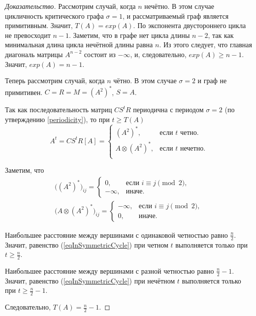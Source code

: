 \documentclass[12pt]{article}
\theoremstyle{definition}
\begin{document}
\begin{proof}[Доказательство]
Рассмотрим случай, когда $n$ нечётно. В этом случае цикличность критического графа $\sigma = 1$, и рассматриваемый граф является примитивным. Значит, $T(A) = exp(A)$. По \cite[теорема 3.1]{kLocalExponent} экспонента двустороннего цикла не превосходит $n - 1$. Заметим, что в графе нет цикла длины $n - 2$, так как минимальная длина цикла нечётной длины равна $n$. Из этого следует, что главная диагональ матрицы $A^{n - 2}$ состоит из $-\infty$, и, следовательно, $exp(A) \ge n - 1$. Значит, $exp(A) = n - 1$.

Теперь рассмотрим случай, когда $n$ чётно. В этом случае $\sigma = 2$ и граф не примитивен. $C = R = M = (A^2)^*$, $S = A$.

Так как последовательность матриц $CS^tR$ периодична с периодом $\sigma = 2$ (по утверждению \ref{periodicity}), то при $t \ge T(A)$ \begin{equation}
\label{eqInSymmetricCycle}
A^t = CS^tR[A] = \begin{cases}
(A^2)^*, &\text{если } t \text{ четно.}\\
A \otimes (A^2)^*, &\text{если } t \text{ нечетно.}\\
\end{cases}
\end{equation}

Заметим, что \begin{align*}
\big((A^2)^* \big)_{ij} = \begin{cases}
0, & \text{если } i \equiv j \pmod{2},  \\
-\infty, & \text{иначе.}
\end{cases} \\
\big(A \otimes (A^2)^* \big)_{ij} = \begin{cases}
-\infty, & \text{если } i \equiv j \pmod{2},  \\
0, & \text{иначе.}
\end{cases}
\end{align*}

Наибольшее расстояние между вершинами с одинаковой четностью равно $\frac{n}{2}$. Значит, равенство (\ref{eqInSymmetricCycle}) при четном $t$ выполняется только при $t \ge \frac{n}{2}$.

Наибольшее расстояние между вершинами с разной четностью равно $\frac{n}{2} - 1$. Значит, равенство (\ref{eqInSymmetricCycle}) при нечётном $t$ выполняется только при $t \ge \frac{n}{2} - 1$.

Следовательно, $T(A) = \frac{n}{2} - 1$.
\end{proof}
\end{document}
